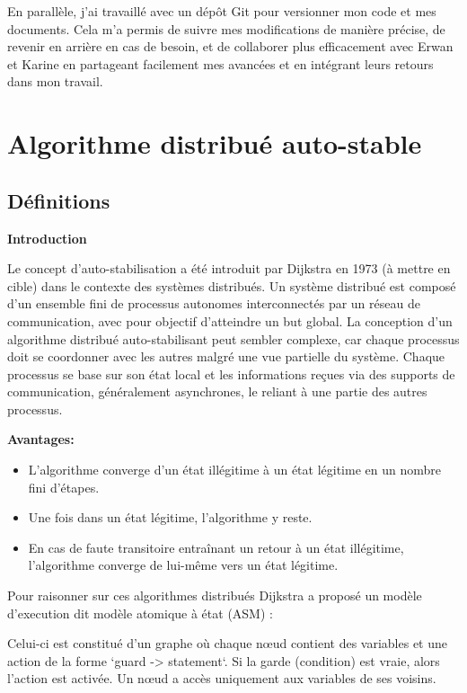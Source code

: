 \documentclass[11pt]{article}
\begin{document}
En parallèle, j'ai travaillé avec un dépôt Git pour versionner mon code et mes documents. 
Cela m'a permis de suivre mes modifications de manière précise, de revenir en arrière en cas de besoin, 
et de collaborer plus efficacement avec Erwan et Karine en partageant facilement mes avancées et en intégrant leurs retours dans mon travail.

\section{Algorithme distribué auto-stable}
\label{sec:orgc512018}


\subsection{Définitions}
\label{sec:org62046a1}


\textbf{\textbf{Introduction}}

Le concept d'auto-stabilisation a été introduit par Dijkstra en 1973 (à mettre en cible) dans le contexte des systèmes distribués. 
Un système distribué est composé d'un ensemble fini de processus autonomes interconnectés par un réseau de communication, 
avec pour objectif d'atteindre un but global. La conception d'un algorithme distribué auto-stabilisant peut sembler complexe, 
car chaque processus doit se coordonner avec les autres malgré une vue partielle du système. 
Chaque processus se base sur son état local et les informations reçues via des supports de communication, généralement asynchrones, 
le reliant à une partie des autres processus.

\textbf{\textbf{Avantages:}}

\begin{itemize}
\item L'algorithme converge d'un état illégitime à un état légitime en un nombre fini d'étapes.
\item Une fois dans un état légitime, l'algorithme y reste.
\item En cas de faute transitoire entraînant un retour à un état illégitime, l'algorithme converge de lui-même vers un état légitime.
\end{itemize}


Pour raisonner sur ces algorithmes distribués Dijkstra a proposé un modèle d'execution dit modèle atomique à état (ASM) : 

Celui-ci est constitué d'un  graphe où chaque nœud contient des variables et une action de la forme `guard -> statement`. 
Si la garde (condition) est vraie, alors l'action est activée. Un nœud a accès uniquement aux variables de ses voisins.
\end{document}
